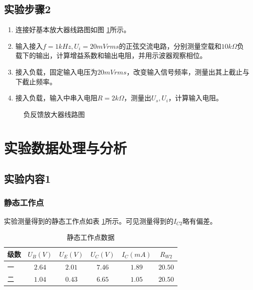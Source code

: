 \documentclass[a4paper,11pt,UTF8]{ctexart}
\begin{document}
  \subsection{实验步骤2}
    \begin{enumerate}
      \item 连接好基本放大器线路图如图 \ref{fig:feedbackCircuit}所示。
      \item 输入接入$f=1kHz,U_i=20mVrms$的正弦交流电路，分别测量空载和$10k\Omega$负载下的输出，计算增益系数和输出电阻，并用示波器观察相位。
      \item 接入负载，固定输入电压为$20mVrms$，改变输入信号频率，测量出其上截止与下截止频率。
      \item 接入负载，输入中串入电阻$R=2k\Omega$，测量出$U_s,U_i$，计算输入电阻。
    \end{enumerate}
    \begin{figure}[htbp]
      \centering
      \caption{负反馈放大器线路图}
      \label{fig:feedbackCircuit}
      \end{figure}

\section{实验数据处理与分析}
\subsection{实验内容1}
  \subsubsection{静态工作点}
  实验测量得到的静态工作点如表 \ref{tab:tab1}所示。可见测量得到的$I_{C2}$略有偏差。
  \begin{table}[!h!tbp]
    \caption{静态工作点数据}\label{tab:tab1}
      \centering
      \begin{tabular}{|l|c|c|c|c|c|}
      \hline
      级数        &$U_B(V)$   &$U_E(V)$ &$U_C(V)$ &$I_C(mA)$  &$R_{W2}$         \\ \hline
      一          &$2.64$     &$2.01$   &$7.46$   &$1.89$     &$20.50$\\ \hline
      二          &$1.04$     &$0.43$   &$6.65$   &$1.05$     &$20.50$\\ \hline
    \end{tabular}
    \end{table}
\end{document}
